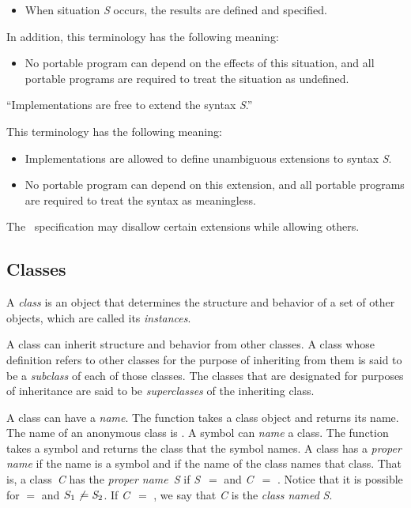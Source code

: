 \begin{flushdesc}
\begin{itemize}
\item  When situation \emph{S} occurs, the results are defined and
specified.

\end{itemize}

\noindent
In addition, this terminology has the following meaning:

\begin{itemize}

\item  No portable program can depend on the effects of this
situation, and all portable programs are required to treat the situation
as undefined.

\end{itemize}

\item[``Implementations are free to extend the syntax \emph{S}.'']

This terminology has the following meaning:

\begin{itemize}

\item  Implementations are allowed to define unambiguous extensions
to syntax \emph{S}.

\item  No portable program can depend on this extension, and
all portable programs are required to treat the syntax
as meaningless.

\end{itemize}
\end{flushdesc}

The \CLOS\ specification may disallow certain extensions while allowing others.


\subsection{Classes}
\label{Classes-SECTION}

A \emph{class\/} is an object that determines the structure and behavior 
of a set of other objects, which are called its \emph{instances}.   

A class can inherit structure and behavior from other classes.  
A class whose definition refers to other classes for the purpose of
inheriting from them is said to be a \emph{subclass\/} of each of
those classes.  The classes that are designated for purposes of
inheritance are said to be \emph{superclasses\/}
of the inheriting class.

A class can have a \emph{name}. The function  takes a
class object and returns its name. The name of an anonymous class is
.  A symbol can \emph{name\/} a class.  The function 
 takes a symbol and returns the class that the symbol
names. A class has a \emph{proper name\/} if the name is a symbol
and if the name of the class
names that class.  That is, a class~\emph{C} has the \emph{proper
name\/}~\emph{S} if \emph{S}~$=$  and \emph{C}~$=$ .  Notice that it is possible for 
$=$  and $S_1\neq \emph{S}_2$.
If \emph{C}~$=$ , we say that \emph{C} is the \emph{class named}
\emph{S}.

